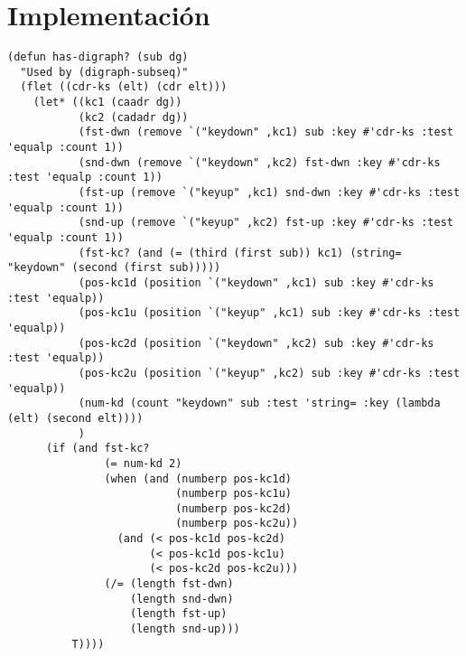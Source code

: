 

\chapter{Implementación}


\begin{lstlisting}[frame=single]
 (defun has-digraph? (sub dg)
  "Used by (digraph-subseq)"
  (flet ((cdr-ks (elt) (cdr elt)))
    (let* ((kc1 (caadr dg))
           (kc2 (cadadr dg))
           (fst-dwn (remove `("keydown" ,kc1) sub :key #'cdr-ks :test 'equalp :count 1))
           (snd-dwn (remove `("keydown" ,kc2) fst-dwn :key #'cdr-ks :test 'equalp :count 1))
           (fst-up (remove `("keyup" ,kc1) snd-dwn :key #'cdr-ks :test 'equalp :count 1))
           (snd-up (remove `("keyup" ,kc2) fst-up :key #'cdr-ks :test 'equalp :count 1))
           (fst-kc? (and (= (third (first sub)) kc1) (string= "keydown" (second (first sub)))))
           (pos-kc1d (position `("keydown" ,kc1) sub :key #'cdr-ks :test 'equalp))
           (pos-kc1u (position `("keyup" ,kc1) sub :key #'cdr-ks :test 'equalp))
           (pos-kc2d (position `("keydown" ,kc2) sub :key #'cdr-ks :test 'equalp))
           (pos-kc2u (position `("keyup" ,kc2) sub :key #'cdr-ks :test 'equalp))
           (num-kd (count "keydown" sub :test 'string= :key (lambda (elt) (second elt))))
           )
      (if (and fst-kc?
               (= num-kd 2)
               (when (and (numberp pos-kc1d)
                          (numberp pos-kc1u)
                          (numberp pos-kc2d)
                          (numberp pos-kc2u))
                 (and (< pos-kc1d pos-kc2d)
                      (< pos-kc1d pos-kc1u)
                      (< pos-kc2d pos-kc2u)))
               (/= (length fst-dwn)
                   (length snd-dwn)
                   (length fst-up)
                   (length snd-up)))
          T))))
\end{lstlisting}


